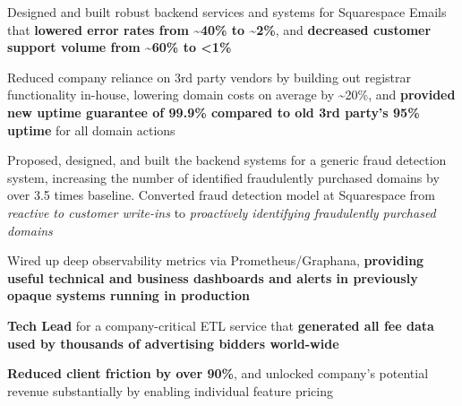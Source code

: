 \documentclass[]{two-column-resume}
\begin{document}
\begin{minipage}[t]{0.65\textwidth}
\begin{tightemize}
                            \item Designed and built robust backend services and systems for Squarespace Emails that \textbf{lowered error rates from \textasciitilde40\% to \textasciitilde2\%}, and \textbf{decreased customer support volume from \textasciitilde60\% to <1\%}
                            \item Reduced company reliance on 3rd party vendors by building out registrar functionality in-house, lowering domain costs on average by \textasciitilde20\%, and \textbf{provided new uptime guarantee of 99.9\% compared to old 3rd party's 95\% uptime} for all domain actions
                            \item Proposed, designed, and built the backend systems for a generic fraud detection system, increasing the number of identified fraudulently purchased domains by over 3.5 times baseline. Converted fraud detection model at Squarespace from \textit{reactive to customer write-ins} to \textit{proactively identifying fraudulently purchased domains}
                            \item Wired up deep observability metrics via Prometheus/Graphana, \textbf{providing useful technical and business dashboards and alerts in previously opaque systems running in production}
                    \end{tightemize}
        \sectionsep
        \vspace{\topsep} %
        \begin{tightemize}
                            \item \textbf{Tech Lead} for a company-critical ETL service that \textbf{generated all fee data used by thousands of advertising bidders world-wide}
                            \item \textbf{Reduced client friction by over 90\%}, and unlocked company's potential revenue substantially by enabling individual feature pricing
                    \end{tightemize}
        \sectionsep
    



\end{minipage}
\end{document}
